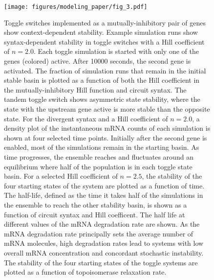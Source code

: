 \documentclass[11pt]{article}
\begin{document}
\begin{figure}[h]
    \centering
    {\texttt{[image: figures/modeling\_paper/fig\_3.pdf]}
    \label{fig:toggle_cartoon} %
    \label{fig:toggle_orientation_examples}
    \label{fig:toggle_basin_stability}
    \label{fig:toggle_basin_stability_over_time}
    \label{fig:toggle_stable_frac_n_2.5}
    \label{fig:toggle_half_life_vs_hill}
    \label{fig:toggle_half_life_vs_mRNA_deg}
    \label{fig:toggle_vs_topo_rate}
    }
\end{figure}
\begin{figure}[h]
    \ContinuedFloat
    \caption{Toggle switches implemented as a mutually-inhibitory pair of genes show context-dependent stability.
         Example simulation runs show syntax-dependent stability in toggle switches with a Hill coefficient of \(n = 2.0\). Each toggle simulation is started with only one of the genes (colored) active. After 10000 seconds, the second gene is activated.
         The fraction of simulation runs that remain in the initial stable basin is plotted as a function of both the Hill coefficient in the mutually-inhibitory Hill function and circuit syntax. The tandem toggle switch shows asymmetric state stability, where the state with the upstream gene active is more stable than the opposite state.
         For the divergent syntax and a Hill coefficient of \(n = 2.0\), a density plot of the instantaneous mRNA counts of each simulation is shown at four selected time points. Initially after the second gene is enabled, most of the simulations remain in the starting basin. As time progresses, the ensemble reaches and fluctuates around an equilibrium where half of the population is in each toggle state basin.
         For a selected Hill coefficient of \(n = 2.5\), the stability of the four starting states of the system are plotted as a function of time.
         The half-life, defined as the time it takes half of the simulations in the ensemble to reach the other stability basin, is shown as a function of circuit syntax and Hill coefficent.
         The half life at different values of the mRNA degradation rate are shown. As the mRNA degradation rate principally sets the average number of mRNA molecules, high degradation rates lead to systems with low overall mRNA concentration and concordant stochastic instability.
         The stability of the four starting states of the toggle systems are plotted as a function of topoisomerase relaxation rate.
    } \label{fig:top:toggle_switch}
\end{figure}
\end{document}
